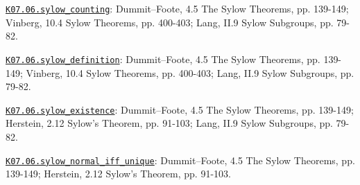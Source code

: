 \par\smallskip\noindent\hypertarget{src:K07.06.sylow_counting}{}\label{src:K07.06.sylow_counting}\hyperref[K07.06.sylow_counting]{\texttt{K07.06.sylow\_counting}}: Dummit--Foote, 4.5 The Sylow Theorems, pp. 139-149; Vinberg, 10.4 Sylow Theorems, pp. 400-403; Lang, II.9 Sylow Subgroups, pp. 79-82.
\par\smallskip\noindent\hypertarget{src:K07.06.sylow_definition}{}\label{src:K07.06.sylow_definition}\hyperref[K07.06.sylow_definition]{\texttt{K07.06.sylow\_definition}}: Dummit--Foote, 4.5 The Sylow Theorems, pp. 139-149; Vinberg, 10.4 Sylow Theorems, pp. 400-403; Lang, II.9 Sylow Subgroups, pp. 79-82.
\par\smallskip\noindent\hypertarget{src:K07.06.sylow_existence}{}\label{src:K07.06.sylow_existence}\hyperref[K07.06.sylow_existence]{\texttt{K07.06.sylow\_existence}}: Dummit--Foote, 4.5 The Sylow Theorems, pp. 139-149; Herstein, 2.12 Sylow's Theorem, pp. 91-103; Lang, II.9 Sylow Subgroups, pp. 79-82.
\par\smallskip\noindent\hypertarget{src:K07.06.sylow_normal_iff_unique}{}\label{src:K07.06.sylow_normal_iff_unique}\hyperref[K07.06.sylow_normal_iff_unique]{\texttt{K07.06.sylow\_normal\_iff\_unique}}: Dummit--Foote, 4.5 The Sylow Theorems, pp. 139-149; Herstein, 2.12 Sylow's Theorem, pp. 91-103.

